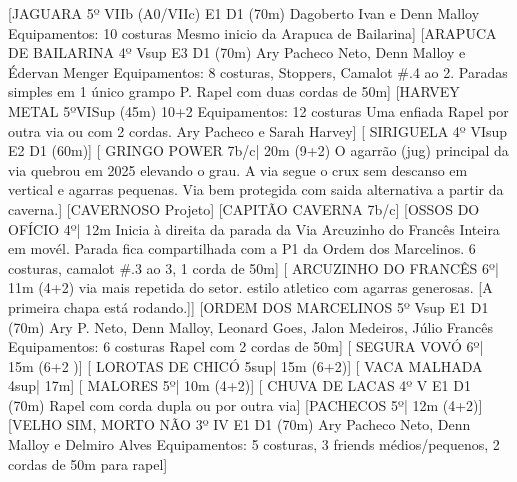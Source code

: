 
\begin{CGSectorRoutes}
    [JAGUARA 5º VIIb (A0/VIIc) E1 D1 (70m) Dagoberto Ivan e Denn Malloy
Equipamentos: 10 costuras Mesmo inicio da Arapuca de Bailarina]
    [ARAPUCA DE BAILARINA 4º Vsup E3 D1 (70m) Ary Pacheco Neto, Denn Malloy e Édervan Menger Equipamentos: 8 costuras, 
Stoppers,
Camalot \#.4 ao 2. Paradas simples em 1 único grampo P. Rapel com duas cordas de 50m]
    [HARVEY METAL 5ºVISup (45m) 10+2 Equipamentos: 12 costuras Uma enfiada Rapel por outra via ou com 2 cordas. Ary Pacheco e Sarah Harvey]
    [ SIRIGUELA 4º VIsup E2 D1 (60m)]
    [ GRINGO POWER 7b/c| 20m (9+2) O agarrão (jug) principal da via quebrou em 2025 elevando o grau. A via segue o crux sem descanso em vertical e agarras pequenas. Via bem protegida com saida alternativa a partir da caverna.]
    [CAVERNOSO Projeto]
    [CAPITÃO CAVERNA 7b/c]
    [OSSOS DO OFÍCIO 4º| 12m Inicia à direita da parada da Via Arcuzinho do Francês Inteira em movél. Parada fica compartilhada com a P1 da Ordem dos Marcelinos. 6 costuras, 
camalot \#.3 ao 3, 
1 corda de 50m]
    [ ARCUZINHO DO FRANCÊS 6º| 11m (4+2) via mais repetida do setor. estilo atletico com agarras generosas. [A primeira chapa está rodando.]]
    [ORDEM DOS MARCELINOS 5º Vsup E1 D1 (70m) Ary P. Neto, Denn Malloy, Leonard Goes, Jalon Medeiros, Júlio Francês
Equipamentos: 6 costuras Rapel com 2 cordas de 50m]
    [ SEGURA VOVÓ 6º| 15m (6+2 )]
    [ LOROTAS DE CHICÓ 5sup| 15m (6+2)]
    [ VACA MALHADA 4sup| 17m]
    [ MALORES 5º| 10m (4+2)]
    [ CHUVA DE LACAS 4º V E1 D1 (70m) Rapel com corda dupla ou por outra via]
    [PACHECOS 5º| 12m (4+2)]
    [VELHO SIM, MORTO NÃO 3º IV E1 D1 (70m) Ary Pacheco Neto, Denn Malloy e Delmiro Alves Equipamentos: 5 costuras, 3 friends médios/pequenos, 2 cordas de 50m para rapel]

\end{CGSectorRoutes}
